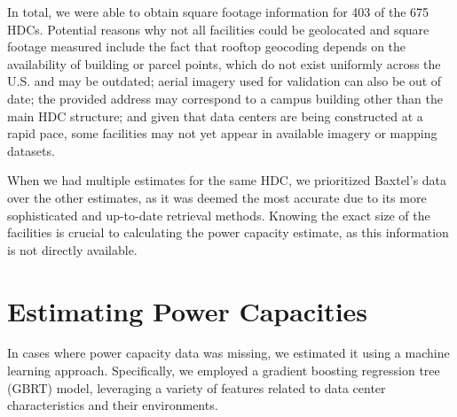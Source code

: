 \documentclass[12pt]{article}
\begin{document}
In total, we were able to obtain square footage information for 403 of the 675 HDCs. Potential reasons why not all facilities could be geolocated and square footage measured include the fact that rooftop geocoding depends on the availability of building or parcel points, which do not exist uniformly across the U.S. and may be outdated; aerial imagery used for validation can also be out of date; the provided address may correspond to a campus building other than the main HDC structure; and given that data centers are being constructed at a rapid pace, some facilities may not yet appear in available imagery or mapping datasets.
    
When we had multiple estimates for the same HDC, we prioritized Baxtel's data over the other estimates, as it was deemed the most accurate due to its more sophisticated and up-to-date retrieval methods. Knowing the exact size of the facilities is crucial to calculating the power capacity estimate, as this information is not directly available.





\section{Estimating Power Capacities}\label{sm:s2}

In cases where power capacity data was missing, we estimated it using a machine learning approach. Specifically, we employed a gradient boosting regression tree (GBRT) model, leveraging a variety of features related to data center characteristics and their environments.
\end{document}

